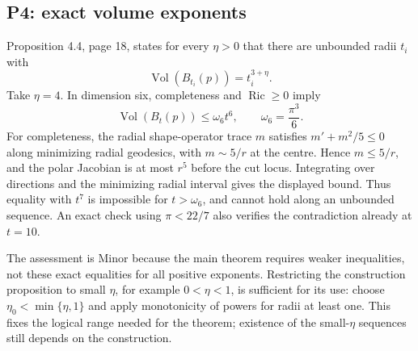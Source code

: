 \documentclass[10pt]{article}
\begin{document}
\subsection*{P4: exact volume exponents}
Proposition 4.4, page 18, states for every \(\eta>0\) that there are unbounded radii \(t_i\) with \[\operatorname{Vol}(B_{t_i}(p))=t_i^{3+\eta}.\] Take \(\eta=4\). In dimension six, completeness and \(\operatorname{Ric}\geq0\) imply \[\operatorname{Vol}(B_t(p))\leq\omega_6t^6,\qquad \omega_6=\frac{\pi^3}{6}.\] For completeness, the radial shape-operator trace \(m\) satisfies \(m'+m^2/5\leq0\) along minimizing radial geodesics, with \(m\sim5/r\) at the centre. Hence \(m\leq5/r\), and the polar Jacobian is at most \(r^5\) before the cut locus. Integrating over directions and the minimizing radial interval gives the displayed bound. Thus equality with \(t^7\) is impossible for \(t>\omega_6\), and cannot hold along an unbounded sequence. An exact check using \(\pi<22/7\) also verifies the contradiction already at \(t=10\).\par
The assessment is Minor because the main theorem requires weaker inequalities, not these exact equalities for all positive exponents. Restricting the construction proposition to small \(\eta\), for example \(0<\eta<1\), is sufficient for its use: choose \(\eta_0<\min\{\eta,1\}\) and apply monotonicity of powers for radii at least one. This fixes the logical range needed for the theorem; existence of the small-\(\eta\) sequences still depends on the construction.\par
\end{document}
